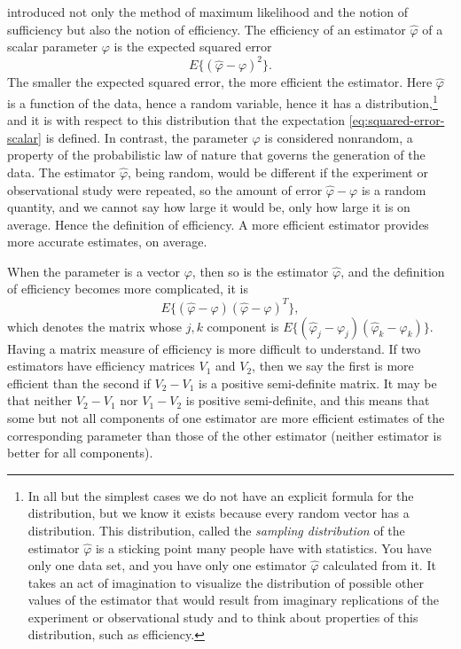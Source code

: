 \documentclass[11pt]{article}
\begin{document}
\citet{fisher} introduced not only the method of maximum likelihood and the
notion of sufficiency but also the notion of efficiency.  The efficiency
of an estimator $\hat{\varphi}$ of a scalar parameter $\varphi$ is the expected
squared error
\begin{equation} \label{eq:squared-error-scalar}
   E \{ (\hat{\varphi} - \varphi)^2 \}.
\end{equation}
The smaller the expected squared error, the more efficient the estimator.
Here $\hat{\varphi}$ is a function of the data, hence a random variable,
hence it has a distribution,\footnote{In all but the simplest cases we do
not have an explicit formula for the distribution, but we know it exists
because every random vector has a distribution.  This distribution, called
the \emph{sampling distribution} of the estimator $\hat{\varphi}$ is a
sticking point many people have with statistics.  You have only one
data set, and you have only one estimator $\hat{\varphi}$ calculated from it.
It takes an act of imagination to visualize the distribution of possible other
values of the estimator that would result from imaginary replications of the
experiment or observational study and to think about properties of
this distribution, such as efficiency.}
and it is with respect to this distribution
that the expectation \eqref{eq:squared-error-scalar} is defined.
In contrast, the parameter $\varphi$
is considered nonrandom, a property of the probabilistic law of nature that
governs the generation of the data.  The estimator $\hat{\varphi}$, being
random, would be different if the experiment or observational study were
repeated, so the amount of error $\hat{\varphi} - \varphi$ is a random
quantity, and we cannot say how large it would be, only how large it
is on average.
Hence the definition of efficiency.  A more efficient estimator provides
more accurate estimates, on average.

When the parameter is a vector $\varphi$,
then so is the estimator $\hat{\varphi}$,
and the definition of efficiency becomes more complicated,
it is
\begin{equation} \label{eq:squared-error-vector}
   E \{ (\hat{\varphi} - \varphi) (\hat{\varphi} - \varphi)^T \},
\end{equation}
which denotes the matrix whose $j, k$ component is
$E \{ (\hat{\varphi}_j - \varphi_j) (\hat{\varphi}_k - \varphi_k) \}$.
Having a matrix measure of efficiency is more difficult to understand.
If two estimators have efficiency matrices $V_1$ and $V_2$, then we say
the first is more efficient than the second if $V_2 - V_1$ is a positive
semi-definite matrix.  It may be that neither $V_2 - V_1$ nor $V_1 - V_2$ is
positive semi-definite, and this means that some but not all components
of one estimator
are more efficient estimates of the corresponding parameter than those of
the other estimator (neither estimator is better for all components).
\end{document}
